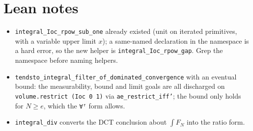\documentclass[11pt]{article}
\begin{document}
\section{Lean notes}
\begin{itemize}
\item \texttt{integral\_Ioc\_rpow\_sub\_one} already existed (unit on iterated primitives, with a
variable upper limit $x$); a same-named declaration in the namespace is a hard error, so the new
helper is \texttt{integral\_Ioc\_rpow\_gap}. Grep the namespace before naming helpers.
\item \texttt{tendsto\_integral\_filter\_of\_dominated\_convergence} with an eventual bound: the
measurability, bound and limit goals are all discharged on \texttt{volume.restrict (Ioc 0 1)} via
\texttt{ae\_restrict\_iff'}; the bound only holds for $N\ge e$, which the \texttt{∀ᶠ} form allows.
\item \texttt{integral\_div} converts the DCT conclusion about $\int F_N$ into the ratio form.
\end{itemize}
\end{document}
